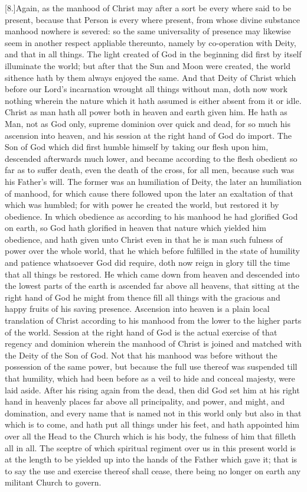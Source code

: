 [8.]Again, as the manhood of Christ may after a sort be every where said to be present, because that Person is every where present, from whose divine substance manhood nowhere is severed: so the same universality of presence may likewise seem in another respect appliable thereunto, namely by co-operation with Deity, and that in all things. The light created of God in the beginning did first by itself illuminate the world; but after that the Sun and Moon were created, the world sithence hath by them always enjoyed the same. And that Deity of Christ which before our Lord’s incarnation wrought all things without man, doth now work nothing wherein the nature which it hath assumed is either absent from it or idle. Christ as man hath all power both in heaven and earth given him. He hath as Man, not as God only, supreme dominion over quick and dead, for so much his ascension into heaven, and his session at the right hand of God do import. The Son of God which did first humble himself by taking our flesh upon him, descended afterwards much lower, and became according to the flesh obedient so far as to suffer death, even the death of the cross, for all men, because such was his Father’s will. The former was an humiliation of Deity, the later an humiliation of manhood, for which cause there  followed upon the later an exaltation of that which was humbled; for with power he created the world, but restored it by obedience. In which obedience as according to his manhood he had glorified God on earth, so God hath glorified in heaven that nature which yielded him obedience, and hath given unto Christ even in that he is man such fulness of power over the whole world, that he which before fulfilled in the state of humility and patience whatsoever God did require, doth now reign in glory till the time that all things be restored. He which came down from heaven and descended into the lowest parts of the earth is ascended far above all heavens, that sitting at the right hand of God he might from thence fill all things with the gracious and happy fruits of his saving presence. Ascension into heaven is a plain local translation of Christ according to his manhood from the lower to the higher parts of the world. Session at the right hand of God is the actual exercise of that regency and dominion wherein the manhood of Christ is joined and matched with the Deity of the Son of God. Not that his manhood was before without the possession of the same power, but because the full use thereof was suspended till that humility, which had been before as a veil to hide and conceal majesty, were laid aside. After his rising again from the dead, then did God set him at his right hand in heavenly places far above all principality, and power, and might, and domination, and every name that is named not in this world only but also in that which is to come, and hath put all things under his feet, and hath appointed him over all the Head to the Church which is his body, the fulness of him that filleth all in all. The sceptre of which spiritual regiment over us in this present world is at the length to be yielded up into the hands of the Father which gave it; that is to say the use and exercise thereof shall  cease, there being no longer on earth any militant Church to govern.
